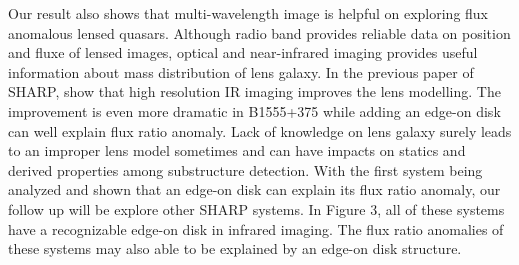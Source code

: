 \documentclass[manuscript]{emulateapj}
\begin{document}
Our result also shows that multi-wavelength image is helpful on exploring flux anomalous lensed quasars. Although radio band provides reliable data on position and fluxe of lensed images, optical and near-infrared imaging provides useful information about mass distribution of lens galaxy. In the previous paper of SHARP, \citet{SHARP12} show that high resolution IR imaging improves the lens modelling. The improvement is even more dramatic in B1555+375 while adding an edge-on disk can well explain flux ratio anomaly. Lack of knowledge on lens galaxy surely leads to an improper lens model sometimes and can have impacts on statics and derived properties among substructure detection. With the first system being analyzed and shown that an edge-on disk can explain its flux ratio anomaly, our follow up will be explore other SHARP systems. In Figure 3, all of these systems have a recognizable edge-on disk in infrared imaging. The flux ratio anomalies of these systems may also able to be explained by an edge-on disk structure.\\
 







\end{document}
